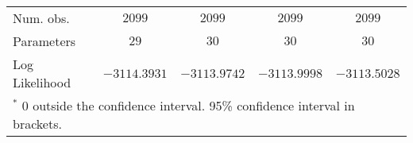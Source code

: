 \documentclass[shortAfour,sageh.bst]{sagej}
\begin{document}
\begin{table*}
\begin{center}
{\begin{tabular}{l c c c c}
\midrule
Num. obs.                           & $2099$                & $2099$                & $2099$                & $2099$                \\
Parameters                          & $29$                  & $30$                  & $30$                  & $30$                  \\
Log Likelihood                      & $-3114.3931$          & $-3113.9742$          & $-3113.9998$          & $-3113.5028$          \\
\bottomrule
\multicolumn{5}{l}{\scriptsize{$^*$ 0 outside the confidence interval. 95\% confidence interval in brackets.}}
\end{tabular}
}\end{center}
\end{table*}
\end{document}
